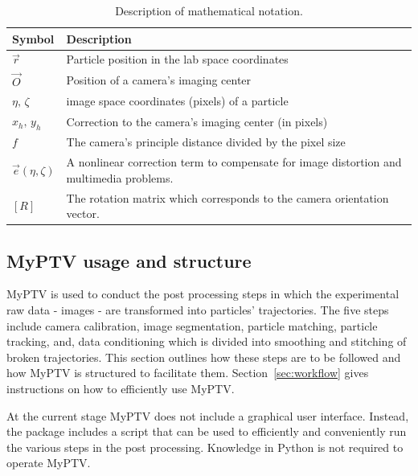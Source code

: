 \documentclass[10pt,a4paper]{article}
\begin{document}
\begin{table}[!ht]
	\centering
	\caption{Description of mathematical notation. \label{tab1:mathdesc}}
	\begin{tabular}{p{5em} p{30em}}
		\hline
		Symbol & Description \\ \hline
		$\vec{r}$ & Particle position in the lab space coordinates\\
		$\vec{O} $& Position of a camera's imaging center \\
		$\eta, \, \zeta$ & image space coordinates (pixels) of a particle \\
		$x_h , \, y_h$ & Correction to the camera's imaging center (in pixels)\\
		$f$ & The camera's principle distance divided by the pixel size \\ 
		$\vec{e}(\eta, \zeta)$ & A nonlinear correction term to compensate for image distortion and multimedia problems.\\
		$[R]$ & The rotation matrix which corresponds to the camera orientation vector. \\  \hline
	\end{tabular}
\end{table}















\subsection{MyPTV usage and structure}


MyPTV is used to conduct the post processing steps in which the experimental raw data - images - are transformed into particles' trajectories. The five steps include camera calibration, image segmentation, particle matching, particle tracking, and, data conditioning which is divided into smoothing and stitching of broken trajectories. This section outlines how these steps are to be followed and how MyPTV is structured to facilitate them. Section~\ref{sec:workflow} gives instructions on how to efficiently use MyPTV. 


At the current stage MyPTV does not include a graphical user interface. Instead, the package includes a script that can be used to efficiently and conveniently run the various steps in the post processing. Knowledge in Python is not required to operate MyPTV.
\end{document}
